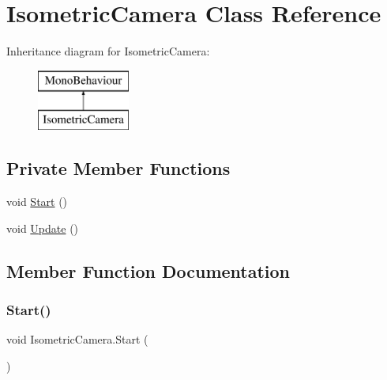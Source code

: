 \hypertarget{class_isometric_camera}{}\section{Isometric\+Camera Class Reference}
\label{class_isometric_camera}
Inheritance diagram for Isometric\+Camera\+:\begin{figure}[H]
\begin{center}
\leavevmode
\includegraphics[height=2.000000cm]{class_isometric_camera}
\end{center}
\end{figure}
\subsection*{Private Member Functions}
\begin{DoxyCompactItemize}
\item 
void \hyperlink{class_isometric_camera_abab67ea7f8d0ac64cb4cea6237a1b171}{Start} ()
\item 
void \hyperlink{class_isometric_camera_a85478a65a084183529f08b390ac9180b}{Update} ()
\end{DoxyCompactItemize}


\subsection{Member Function Documentation}
\mbox{\label{class_isometric_camera_abab67ea7f8d0ac64cb4cea6237a1b171}} 
\subsubsection{\texorpdfstring{Start()}{Start()}}
{\footnotesize\ttfamily void Isometric\+Camera.\+Start (\begin{DoxyParamCaption}{ }\end{DoxyParamCaption})\hspace{0.3cm}{\ttfamily [private]}}

\mbox{\label{class_isometric_camera_a85478a65a084183529f08b390ac9180b}} 
